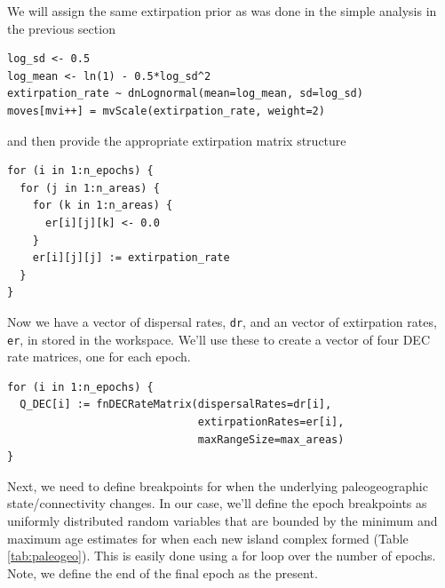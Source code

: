 

We will assign the same extirpation prior as was done in the simple analysis in the previous section

\begin{snugshade}
\begin{lstlisting}
log_sd <- 0.5
log_mean <- ln(1) - 0.5*log_sd^2
extirpation_rate ~ dnLognormal(mean=log_mean, sd=log_sd)
moves[mvi++] = mvScale(extirpation_rate, weight=2)
\end{lstlisting}
\end{snugshade}

and then provide the appropriate extirpation matrix structure

\begin{snugshade}
\begin{lstlisting}
for (i in 1:n_epochs) {
  for (j in 1:n_areas) {
    for (k in 1:n_areas) {
      er[i][j][k] <- 0.0
    }
    er[i][j][j] := extirpation_rate
  }
}
\end{lstlisting}
\end{snugshade}

Now we have a vector of dispersal rates, {\tt dr}, and an vector of extirpation rates, {\tt er}, in stored in the \RevBayes workspace.
We'll use these to create a vector of four DEC rate matrices, one for each epoch.

\begin{snugshade}
\begin{lstlisting}
for (i in 1:n_epochs) {
  Q_DEC[i] := fnDECRateMatrix(dispersalRates=dr[i],
                              extirpationRates=er[i],
                              maxRangeSize=max_areas)
}
\end{lstlisting}
\end{snugshade}

Next, we need to define breakpoints for when the underlying paleogeographic state/connectivity changes.
In our case, we'll define the epoch breakpoints as uniformly distributed random variables that are bounded by the minimum and maximum age estimates for when each new island complex formed (Table \ref{tab:paleogeo}).
This is easily done using a for loop over the number of epochs.
Note, we define the end of the final epoch as the present.


